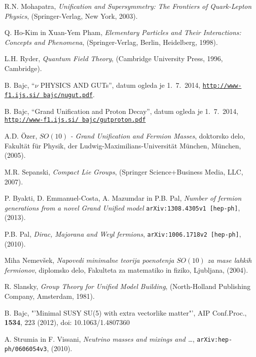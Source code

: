 \documentclass[12pt,a4paper,final,openright,twoside]{report}
\numberwithin{equation}{chapter}
\numberwithin{table}{chapter}
\begin{document}
\begin{thebibliography}{9}
		R.N. Mohapatra, \emph{Unification and Supersymmetry: The Frontiers of Quark-Lepton
		Physics}, (Springer-Verlag, New York, 2003).
		
		Q. Ho-Kim in Xuan-Yem Pham, \emph{Elementary Particles and Their Interactions: Concepts and Phenomena},
		(Springer-Verlag, Berlin, Heidelberg, 1998).
		
		L.H. Ryder, \emph{Quantum Field Theory}, (Cambridge University Press, 1996, Cambridge).
		
		B. Bajc, "`$\nu$ PHYSICS AND GUTs"', datum ogleda je 1.~7.~2014,
		\href{http://www-f1.ijs.si/~bajc/nugut.pdf}{\texttt{http://www-f1.ijs.si/~bajc/nugut.pdf}}.
		
		B. Bajc, "`Grand Unification and Proton Decay"', datum ogleda je 1.~7.~2014,
		\href{http://www-f1.ijs.si/~bajc/gutproton.pdf}{\texttt{http://www-f1.ijs.si/~bajc/gutproton.pdf}}
		
		A.D. Özer, \emph{$SO(10)$ - Grand Unification and Fermion Masses}, doktorsko delo, Fakultät für Physik,
		der Ludwig-Maximilians-Universität München, München, (2005).
		
	 	M.R. Sepanski, \emph{Compact Lie Groups}, (Springer Science+Business Media, LLC, 2007).
		
		P. Byakti, D. Emmanuel-Costa, A. Mazumdar in P.B. Pal,
		\emph{Number of fermion generations from a novel Grand Unified model}
		\texttt{arXiv:1308.4305v1 [hep-ph]}, (2013).
		
		P.B. Pal, \emph{Dirac, Majorana and Weyl fermions},
		\texttt{arXiv:1006.1718v2 [hep-ph]}, (2010).
			
		Miha Nemevšek, \emph{Napovedi minimalne teorija poenotenja $SO(10)$ za mase lahkih fermionov},
		diplomsko delo, Fakulteta za matematiko in fiziko, Ljubljana, (2004).

		R. Slansky,
		\emph{Group Theory for Unified Model Building},
		(North-Holland Publishing Company, Amsterdam, 1981).
		
		B. Bajc,
		"'Minimal SUSY SU(5) with extra vectorlike matter"',
		AIP Conf.Proc.,
		{\bf 1534}, 223 (2012),
		doi: 10.1063/1.4807360	
		
		A. Strumia in F. Vissani,
		\emph{Neutrino masses and mixings and \ldots},
		\texttt{arXiv:hep-ph/0606054v3}, (2010).
		

\end{thebibliography}
\end{document}
